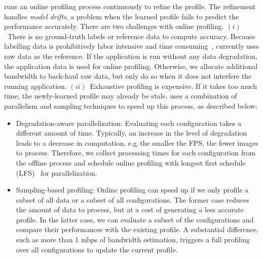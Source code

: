 
 \sysname{} runs an online profiling process
continuously to refine the profile. The refinement handles \textit{model
  drifts}, a problem when the learned profile fails to predict the performance
accurately. There are two challenges with online profiling.
$(i)$~There is no ground-truth labels or reference data to compute
accuracy. Because labelling data is prohibitively labor intensive and time
consuming~\cite{russell2008labelme}, \sysname{} currently uses raw data as the
reference. If the application is run without any data degradation, the
application data is used for online profiling. Otherwise, we allocate additional
bandwidth to back-haul raw data, but only do so when it does not interfere the
running application.
$(ii)$~Exhaustive profiling is expensive. If it takes too much time,
the newly-learned profile may already be stale. \sysname{} uses a combination of
parallelism and sampling techniques to speed up this process, as described below:

\begin{itemize}[leftmargin=*, topsep=0pt, itemsep=0pt]

\item Degradation-aware parallelization: Evaluating each configuration takes a
  different amount of time. Typically, an increase in the level of degradation
  leads to a decrease in computation, e.g.\,the smaller the FPS, the fewer
  images to process. Therefore, we collect processing times for each
  configuration from the offline process and schedule online profiling with
  longest first schedule (LFS)~\cite{karger2010scheduling} for parallelization.

\item Sampling-based profiling: Online profiling can speed up if we only profile
  a subset of all data or a subset of all configurations.  The former case
  reduces the amount of data to process, but at a cost of generating a less
  accurate profile. In the latter case, we can evaluate a subset of the
  configurations and compare their performances with the existing profile. A
  substantial difference, such as more than 1 mbps of bandwidth estimation,
  triggers a full profiling over all configurations to update the current
  profile.

\end{itemize}

